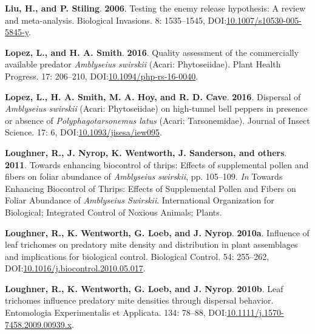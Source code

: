 \documentclass[12pt,final,CPage]{ufthesis}
\newlength{\cslhangindent}
\newenvironment{CSLReferences}[2] %
{%
	\setlength{\parindent}{0pt}
	\ifodd #1 \everypar{\setlength{\hangindent}{\cslhangindent}}\ignorespaces\fi
	\ifnum #2 > 0
	\setlength{\parskip}{#2\baselineskip}
	\fi
}%
{}
\begin{document}
{\begin{CSLReferences}{1}{0}
  \leavevmode{}%
  \textbf{Liu, H., and P. Stiling}. \textbf{2006}. Testing the enemy release hypothesis: A review and meta-analysis. Biological Invasions. 8: 1535--1545, DOI:\href{https://doi.org/10.1007/s10530-005-5845-y}{10.1007/s10530-005-5845-y}.

  \leavevmode{}%
  \textbf{Lopez, L., and H. A. Smith}. \textbf{2016}. Quality assessment of the commercially available predator {\emph{Amblyseius swirskii}} ({Acari}: {Phytoseiidae}). Plant Health Progress. 17: 206--210, DOI:\href{https://doi.org/10.1094/php-rs-16-0040}{10.1094/php-rs-16-0040}.

  \leavevmode{}%
  \textbf{Lopez, L., H. A. Smith, M. A. Hoy, and R. D. Cave}. \textbf{2016}. Dispersal of {\emph{Amblyseius swirskii}} ({Acari}: {Phytoseiidae}) on high-tunnel bell peppers in presence or absence of {\emph{Polyphagotarsonemus latus}} ({Acari}: {Tarsonemidae}). Journal of Insect Science. 17: 6, DOI:\href{https://doi.org/10.1093/jisesa/iew095}{10.1093/jisesa/iew095}.

  \leavevmode{}%
  \textbf{Loughner, R., J. Nyrop, K. Wentworth, J. Sanderson, and others}. \textbf{2011}. Towards enhancing biocontrol of thrips: Effects of supplemental pollen and fibers on foliar abundance of {\emph{Amblyseius swirskii}}, pp. 105--109. \emph{In} Towards Enhancing Biocontrol of Thrips: Effects of Supplemental Pollen and Fibers on Foliar Abundance of {\emph{Amblyseius Swirskii}}. International Organization for Biological; Integrated Control of Noxious Animals; Plants.

  \leavevmode{}%
  \textbf{Loughner, R., K. Wentworth, G. Loeb, and J. Nyrop}. \textbf{2010a}. Influence of leaf trichomes on predatory mite density and distribution in plant assemblages and implications for biological control. Biological Control. 54: 255--262, DOI:\href{https://doi.org/10.1016/j.biocontrol.2010.05.017}{10.1016/j.biocontrol.2010.05.017}.

  \leavevmode{}%
  \textbf{Loughner, R., K. Wentworth, G. Loeb, and J. Nyrop}. \textbf{2010b}. Leaf trichomes influence predatory mite densities through dispersal behavior. Entomologia Experimentalis et Applicata. 134: 78--88, DOI:\href{https://doi.org/10.1111/j.1570-7458.2009.00939.x}{10.1111/j.1570-7458.2009.00939.x}.


\end{CSLReferences}}
\end{document}

